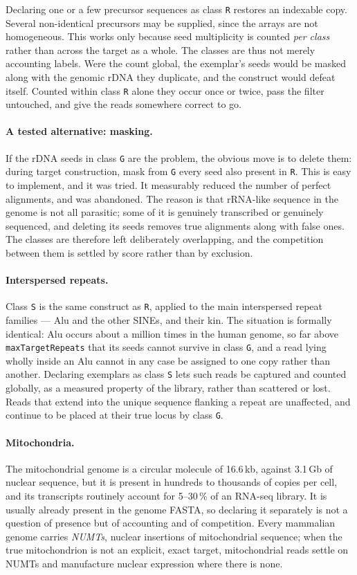\documentclass[11pt]{article}
\begin{document}
Declaring one or a few precursor sequences as class \texttt{R} restores
an indexable copy.
Several non-identical precursors may be supplied, since the arrays are
not homogeneous.
This works only because seed multiplicity is counted \emph{per class}
rather than across the target as a whole.
The classes are thus not merely accounting labels.
Were the count global, the exemplar's seeds would be masked along with
the genomic rDNA they duplicate, and the construct would defeat itself.
Counted within class \texttt{R} alone they occur once or twice, pass the
filter untouched, and give the reads somewhere correct to go.

\paragraph{A tested alternative: masking.}
If the rDNA seeds in class \texttt{G} are the problem, the obvious move
is to delete them: during target construction, mask from \texttt{G}
every seed also present in \texttt{R}.
This is easy to implement, and it was tried.
It measurably reduced the number of perfect alignments, and was
abandoned.
The reason is that rRNA-like sequence in the genome is not all
parasitic; some of it is genuinely transcribed or genuinely sequenced,
and deleting its seeds removes true alignments along with false ones.
The classes are therefore left deliberately overlapping, and the
competition between them is settled by score rather than by exclusion.

\paragraph{Interspersed repeats.}
Class \texttt{S} is the same construct as \texttt{R}, applied to the
main interspersed repeat families --- Alu and the other SINEs, and their
kin.
The situation is formally identical: Alu occurs about a million times in
the human genome, so far above \texttt{maxTargetRepeats} that its seeds
cannot survive in class \texttt{G}, and a read lying wholly inside an
Alu cannot in any case be assigned to one copy rather than another.
Declaring exemplars as class \texttt{S} lets such reads be captured and
counted globally, as a measured property of the library, rather than
scattered or lost.
Reads that extend into the unique sequence flanking a repeat are
unaffected, and continue to be placed at their true locus by class
\texttt{G}.

\paragraph{Mitochondria.}
The mitochondrial genome is a circular molecule of 16.6\,kb, against
3.1\,Gb of nuclear sequence, but it is present in hundreds to thousands
of copies per cell, and its transcripts routinely account for 5--30\,\%
of an RNA-seq library.
It is usually already present in the genome FASTA, so declaring it
separately is not a question of presence but of accounting and of
competition.
Every mammalian genome carries \emph{NUMTs}, nuclear insertions of
mitochondrial sequence; when the true mitochondrion is not an explicit,
exact target, mitochondrial reads settle on NUMTs and manufacture
nuclear expression where there is none.
\end{document}
